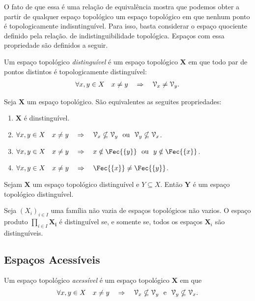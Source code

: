 O fato de que essa é uma relação de equivalência mostra que podemos obter a partir de qualquer espaço topológico um espaço topológico em que nenhum ponto é topologicamente indisntinguível. Para isso, basta considerar o espaço quociente definido pela relação. de indistinguibilidade topológica. Espaços com essa propriedade são definidos a seguir.

\begin{defi}[$T_0$]
Um espaço topológico \emph{distinguível} é um espaço topológico $\bm X$ em que todo par de pontos distintos é topologicamente distinguível:
	\begin{equation*}
	\forall x,y \in X \quad x \neq y \quad \Rightarrow \quad \mathcal{V}_x \neq \mathcal{V}_y.
	\end{equation*}
\end{defi}

\begin{prop}
Seja $\bm X$ um espaço topológico. São equivalentes as seguites propriedades:
	\begin{enumerate}
	\item $\bm X$ é dinstinguível.
	\item $\forall x,y \in X \quad x \neq y \quad \Rightarrow \quad \mathcal{V}_x \nsubseteq \mathcal{V}_y \text{\ \ ou\ \ } \mathcal{V}_y \nsubseteq \mathcal{V}_x$.
	\item $\forall x,y \in X \quad x \neq y \quad \Rightarrow \quad x \notin \Fec{\{y\}} \ou y \notin \Fec{\{x\}}$.
	\item $\forall x,y \in X \quad x \neq y \quad \Rightarrow \quad \Fec{\{x\}} \neq \Fec{\{y\}}$.	
\end{enumerate}
\end{prop}

\begin{prop}
Sejam $\bm X$ um espaço topológico distinguível e $Y \subseteq X$. Então $\bm Y$ é um espaço topológico distinguível.
\end{prop}

\begin{prop}
Seja $(X_i)_{i \in I}$ uma família não vazia de espaços topológicos não vazios. O espaço produto $\prod_{i \in I} \bm{X_i}$ é distinguível se, e somente se, todos os espaços $\bm X_i$ são distinguíveis.
\end{prop}

\subsection{Espaços Acessíveis}

\begin{defi}[$T_1$]
Um espaço topológico \emph{acessível} é um espaço topológico $\bm X$ em que
	\begin{equation*}
	\forall x,y \in X \quad x \neq y \quad \Rightarrow \quad \mathcal{V}_x \nsubseteq \mathcal{V}_y \text{\ \ e\ \ } \mathcal{V}_y \nsubseteq \mathcal{V}_x.
	\end{equation*}
\end{defi}

